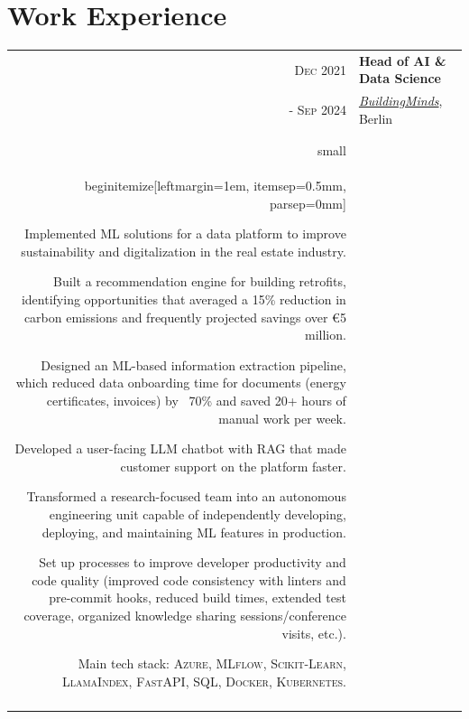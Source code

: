 \documentclass[a4paper,10pt]{article}
\begin{document}
\section{Work Experience}

\begin{tabular}{r|p{14.5cm}}

 \textsc{Dec 2021} & 
 \textbf{Head of AI \& Data Science} \\ 
 \textsc{- Sep 2024} & 
 \emph{\href{https://buildingminds.com/}{BuildingMinds}}, Berlin \\\\
 & \\small\\begin{itemize}[leftmargin=1em, itemsep=0.5mm, parsep=0mm]
   \item Implemented ML solutions for a data platform to improve sustainability and digitalization in the real estate industry.
   \item Built a recommendation engine for building retrofits, identifying opportunities that averaged a 15\% reduction in carbon emissions and frequently projected savings over €5 million.
   \item Designed an ML-based information extraction pipeline, which reduced data onboarding time for documents (energy certificates, invoices) by ~70\% and saved 20+ hours of manual work per week.
   \item Developed a user-facing LLM chatbot with RAG that made customer support on the platform faster.
   \item Transformed a research-focused team into an autonomous engineering unit capable of independently developing, deploying, and maintaining ML features in production.
   \item Set up processes to improve developer productivity and code quality
    {\scriptsize (improved code consistency with linters and pre-commit hooks, reduced build times, extended test coverage, organized knowledge sharing sessions/conference visits, etc.)}.
   \item Main tech stack: \textsc{Azure}, \textsc{MLflow}, \textsc{Scikit-Learn}, \textsc{LlamaIndex}, \textsc{FastAPI}, \textsc{SQL}, \textsc{Docker}, \textsc{Kubernetes}.
   \end{itemize} \\
   \multicolumn{2}{c}{} \\


\end{tabular}
\end{document}
